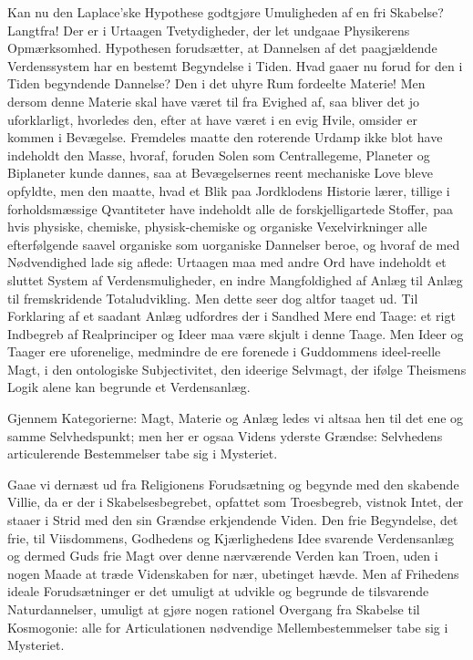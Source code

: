 \documentclass[12pt]{book}
\begin{document}
Kan nu den Laplace'ske Hypothese godtgjøre Umuligheden af en fri
Skabelse? Langtfra! Der er i Urtaagen Tvetydigheder, der let undgaae
Physikerens Opmærksomhed. Hypothesen forudsætter, at Dannelsen af
det paagjældende Verdenssystem har en bestemt Begyndelse i Tiden.
Hvad gaaer nu forud for den i Tiden begyndende Dannelse? Den i det
uhyre Rum fordeelte Materie! Men dersom denne Materie skal have
været til fra Evighed af, saa bliver det jo uforklarligt, hvorledes
den, efter at have været i en evig Hvile, omsider er kommen i
Bevægelse. Fremdeles maatte den roterende Urdamp ikke blot have
indeholdt den Masse, hvoraf, foruden Solen som Centrallegeme,
Planeter og Biplaneter kunde dannes, saa at Bevægelsernes reent
mechaniske Love bleve opfyldte, men den maatte, hvad et Blik paa
Jordklodens Historie lærer, tillige i forholdsmæssige Qvantiteter
have indeholdt alle de forskjelligartede Stoffer, paa hvis physiske,
chemiske, physisk-chemiske og organiske Vexelvirkninger alle
efterfølgende saavel organiske som uorganiske Dannelser beroe, og
hvoraf de med Nødvendighed lade sig aflede: Urtaagen maa med andre
Ord have indeholdt et sluttet System af Verdensmuligheder, en indre
Mangfoldighed af Anlæg til Anlæg til fremskridende Totaludvikling.
Men dette seer dog altfor taaget ud. Til Forklaring af et saadant
Anlæg udfordres
der i Sandhed Mere end Taage: et rigt Indbegreb af Realprinciper og
Ideer maa være skjult i denne Taage. Men Ideer og Taager ere
uforenelige, medmindre de ere forenede i Guddommens ideel-reelle
Magt, i den ontologiske Subjectivitet, den ideerige Selvmagt, der
ifølge Theismens Logik alene kan begrunde et Verdensanlæg.

Gjennem Kategorierne: Magt, Materie og Anlæg ledes vi altsaa hen til
det ene og samme Selvhedspunkt; men her er ogsaa Videns yderste
Grændse: Selvhedens articulerende Bestemmelser tabe sig i Mysteriet.

Gaae vi dernæst ud fra Religionens Forudsætning og begynde med den
skabende Villie, da er der i Skabelsesbegrebet, opfattet som
Troesbegreb, vistnok Intet, der staaer i Strid med den sin Grændse
erkjendende Viden. Den frie Begyndelse, det frie, til Viisdommens,
Godhedens og Kjærlighedens Idee svarende Verdensanlæg og dermed Guds
frie Magt over denne nærværende Verden kan Troen, uden i nogen Maade
at træde Videnskaben for nær, ubetinget hævde. Men af Frihedens
ideale Forudsætninger er det umuligt at udvikle og begrunde de
tilsvarende Naturdannelser, umuligt at gjøre nogen rationel Overgang
fra Skabelse til Kosmogonie: alle for Articulationen nødvendige
Mellembestemmelser tabe sig i Mysteriet.
\end{document}

